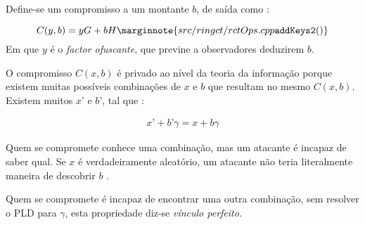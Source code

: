 
Define-se um compromisso a um montante $b$, de saída como :

\vspace{.175cm}
\[C(y,b) = y G + b H\marginnote{src/ringct/ rctOps.cpp {\tt addKeys2()}}\]
\vspace{.175cm}
\newline
Em que $y$ é o {\em factor ofuscante}, que previne a observadores deduzirem $b$.


O compromisso $C(x, b)$ é privado ao nível da teoria da informação porque existem muitas possíveis combinações de $x$ e $b$ que resultam no mesmo $C(x, b)$.\newline
Existem muitos $x’$ e $b’$, tal que :

\begin{align*}
x’ + b’ \gamma = x + b \gamma
\end{align*}

Quem se compromete conhece uma combinação, mas um atacante é incapaz de saber qual. Se $x$ é verdadeiramente aleatório, um atacante não teria literalmente maneira de descobrir $b$ \cite{maxwell-ct, SCOZZAFAVA1993313}.  

Quem se compromete é incapaz de encontrar uma outra combinação, sem resolver o PLD para $\gamma$, esta propriedade diz-se {\em vínculo perfeito}.  

